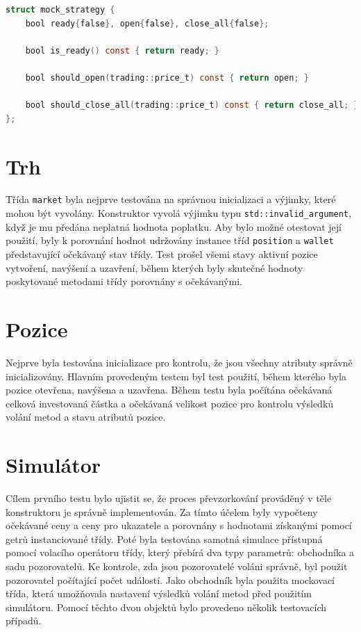 \begin{lstlisting}[caption={~Implementace falešná strategie},label={lst:mock:strategy},captionpos=t,abovecaptionskip=-\medskipamount,belowcaptionskip=\medskipamount,language=C]
struct mock_strategy {
    bool ready{false}, open{false}, close_all{false};

    bool is_ready() const { return ready; }

    bool should_open(trading::price_t) const { return open; }

    bool should_close_all(trading::price_t) const { return close_all; }
};
\end{lstlisting}

\section{Trh}
Třída \texttt{market} byla nejprve testována na správnou inicializaci a výjimky, které mohou být vyvolány.
Konstruktor vyvolá výjimku typu \texttt{std::invalid\_argument}, když je mu předána neplatná hodnota poplatku.
Aby bylo možné otestovat její použití, byly k porovnání hodnot udržovány instance tříd \texttt{position} a \texttt{wallet} představující očekávaný stav třídy.
Test prošel všemi stavy aktivní pozice vytvoření, navýšení a uzavření, během kterých byly skutečné hodnoty poskytované metodami třídy porovnány s očekávanými.

\section{Pozice}
Nejprve byla testována inicializace pro kontrolu, že jsou všechny atributy správně inicializovány.
Hlavním provedeným testem byl test použití, během kterého byla pozice otevřena, navýšena a uzavřena.
Během testu byla počítána očekávaná celková investovaná částka a očekávaná velikost pozice pro kontrolu výsledků volání metod a stavu atributů pozice.

\section{Simulátor}
Cílem prvního testu bylo ujistit se, že proces převzorkování prováděný v těle konstruktoru je správně implementován.
Za tímto účelem byly vypočteny očekávané ceny a ceny pro ukazatele a porovnány s hodnotami získanými pomocí getrů instanciované třídy.
Poté byla testována samotná simulace přístupná pomocí volacího operátoru třídy, který přebírá dva typy parametrů: obchodníka a sadu pozorovatelů.
Ke kontrole, zda jsou pozorovatelé voláni správně, byl použit pozorovatel počítající počet událostí.
Jako obchodník byla použita mockovací třída, která umožňovala nastavení výsledků volání metod před použitím simulátoru.
Pomocí těchto dvou objektů bylo provedeno několik testovacích případů.

